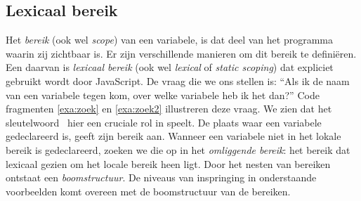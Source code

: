 \subsection{Lexicaal bereik}

Het \emph{bereik} (ook wel \emph{scope}) van een variabele, is dat deel van het programma waarin zij zichtbaar is. Er zijn verschillende manieren om dit bereik te definiëren. Een daarvan is \emph{lexicaal bereik} (ook wel \emph{lexical} of \emph{static scoping}) dat expliciet gebruikt wordt door JavaScript.
De vraag die we ons stellen is: ``Als ik de naam van een variabele tegen kom, over welke variabele heb ik het dan?'' Code fragmenten \ref{exa:zoek} en \ref{exa:zoek2} illustreren deze vraag. We zien dat het sleutelwoord \LOCAL\ hier een cruciale rol in speelt. De plaats waar een variabele gedeclareerd is, geeft zijn bereik aan. Wanneer een variabele niet in het lokale bereik is gedeclareerd, zoeken we die op in het \emph{omliggende bereik}: het bereik dat lexicaal gezien om het locale bereik heen ligt.
Door het nesten van bereiken ontstaat een \emph{boomstructuur}. De niveaus van inspringing in onderstaande voorbeelden komt overeen met de boomstructuur van de bereiken.%

\begin{NoBreak}
\codeFragmentCaption
{}
\end{NoBreak}

\begin{NoBreak}
\codeFragmentCaption
{}
\end{NoBreak}

